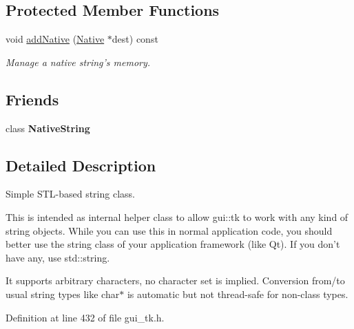 \subsection*{Protected Member Functions}
\begin{DoxyCompactItemize}
\item 
\hypertarget{classGUI_1_1String_aee056eca155c99dcda0c4f65899e7b1f}{void \hyperlink{classGUI_1_1String_aee056eca155c99dcda0c4f65899e7b1f}{add\-Native} (\hyperlink{classGUI_1_1String_1_1Native}{Native} $\ast$dest) const }\label{classGUI_1_1String_aee056eca155c99dcda0c4f65899e7b1f}

\begin{DoxyCompactList}\small\item\em Manage a native string's memory. \end{DoxyCompactList}\end{DoxyCompactItemize}
\subsection*{Friends}
\begin{DoxyCompactItemize}
\item 
\hypertarget{classGUI_1_1String_adf0ad3438dafc3424870951a9f75f05e}{class {\bfseries Native\-String}}\label{classGUI_1_1String_adf0ad3438dafc3424870951a9f75f05e}

\end{DoxyCompactItemize}


\subsection{Detailed Description}
Simple S\-T\-L-\/based string class. 

This is intended as internal helper class to allow gui\-::tk to work with any kind of string objects. While you can use this in normal application code, you should better use the string class of your application framework (like Qt). If you don't have any, use std\-::string.

It supports arbitrary characters, no character set is implied. Conversion from/to usual string types like {\ttfamily char$\ast$} is automatic but not thread-\/safe for non-\/class types. 

Definition at line 432 of file gui\-\_\-tk.\-h.



